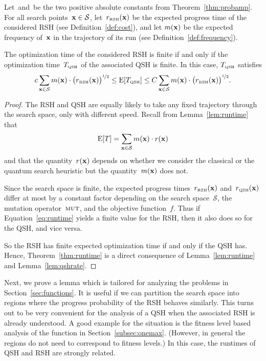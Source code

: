 \documentclass[a4paper,11pt]{article}
\begin{document}
\begin{theorem}\label{thm:runtime}
Let~\lb and~\ub be the two positive absolute constants from Theorem~\ref{thm:probamp}. For all search points~$\xvec\in\mathcal{S}$, let~$r_\RSH(\xvec)$ be the expected progress time of the considered RSH (see Definition~\ref{def:cost}), and let $m(\xvec)$ be the expected frequency of~$\xvec$ in the trajectory of its run (see Definition~\ref{def:frequency}).

The optimization time of the considered RSH is finite if and only if the optimization time~$T_{\text{\tiny\rm QSH}}$ of the associated QSH is finite. In this case, $T_{\text{\tiny\rm QSH}}$ satisfies
\[
\lb \sum_{\xvec \in \mathcal{S}} m(\xvec) \cdot \big(r_\RSH(\xvec)\big)^{\nicefrac{1}{2}}\le\EXP[T_\QSH]\le\ub \sum_{\xvec \in \mathcal{S}} m(\xvec) \cdot \big(r_\RSH(\xvec)\big)^{\nicefrac{1}{2}}.
\]
\end{theorem}

\begin{proof}
The RSH and QSH are equally likely to take any fixed trajectory through the search space, only with different speed. Recall from Lemma~\ref{lem:runtime} that 
\begin{equation}\label{eq:runtime}
\EXP[T] = \sum_{\xvec \in \mathcal{S}} m(\xvec) \cdot r(\xvec)
\end{equation}
and that the quantity~$r(\xvec)$ depends on whether we consider the classical or the quantum search heuristic but the quantity~$m(\xvec)$ does not.

Since the search space is finite, the expected progress times~$r_\RSH(\xvec)$ and~$r_\QSH(\xvec)$ differ at most by a constant factor depending on the search space~$\mathcal{S}$, the mutation operator~$\textsc{mut}$, and the objective function~$f$. Thus if Equation~\eqref{eq:runtime} yields a finite value for the RSH, then it also does so for the QSH, and vice versa.

So the RSH has finite expected optimization time if and only if the QSH has. Hence, Theorem~\ref{thm:runtime} is a direct consequence of Lemma~\ref{lem:runtime} and Lemma~\ref{lem:qshrate}.
\end{proof}

Next, we prove a lemma which is tailored for analyzing the problems in Section~\ref{sec:functions}. It is useful if we can partition the search space into regions where the progress probability of the RSH behaves similarly. This turns out to be very convenient for the analysis of a QSH when the associated RSH is already understood. A good example for the situation is the fitness level based analysis of the function \onemax in Section~\ref{subsec:onemax}. (However, in general the regions do not need to correspond to fitness levels.) In this case, the runtimes of QSH and RSH are strongly related.
\end{document}
